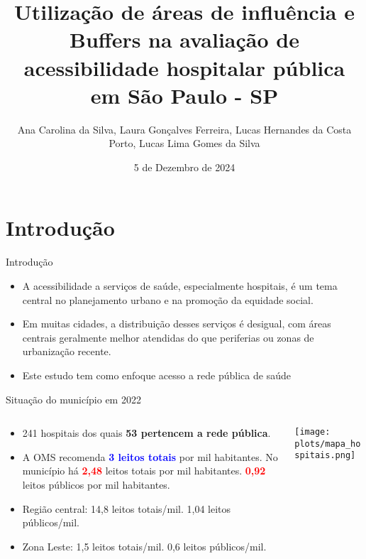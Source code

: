 \documentclass{beamer}
\title{Utilização de áreas de influência e Buffers na avaliação de acessibilidade hospitalar pública em São Paulo - SP}
\author{Ana Carolina da Silva, Laura Gonçalves Ferreira,  Lucas Hernandes da Costa Porto, Lucas Lima Gomes da Silva}
\institute{Universidade de São Paulo}
\date{5 de Dezembro de 2024} %
\begin{document}
\begin{frame}
    \titlepage
\end{frame}


\section{Introdução}
\begin{frame}{Introdução}
            \begin{itemize}
                \item A acessibilidade a serviços de saúde, especialmente hospitais, é um tema central no planejamento urbano e na promoção da equidade social.
                \item Em muitas cidades, a distribuição desses serviços é desigual, com áreas centrais geralmente melhor atendidas do que periferias ou zonas de urbanização recente.
                \item Este estudo tem como enfoque acesso a rede pública de saúde
            \end{itemize}

\end{frame}

\begin{frame}{Situação do município em 2022}
    \begin{columns}
        \begin{column}{0.6\textwidth}
            \begin{itemize}
                \item 241 hospitais dos quais \textbf{53 pertencem a rede pública}.
                \item A OMS recomenda \textbf{\textcolor{blue}{3 leitos totais}} por mil habitantes. No município há \textbf{\textcolor{red}{2,48}} leitos totais por mil habitantes. \textbf{\textcolor{red}{0,92}} leitos públicos por mil habitantes. 
                \item Região central: 14,8 leitos totais/mil. 1,04 leitos públicos/mil.
                \item Zona Leste: 1,5 leitos totais/mil. 0,6 leitos públicos/mil.
            \end{itemize}
        \end{column}

        \begin{column}{0.4\textwidth}
            \centering
            \texttt{[image: plots/mapa\_hospitais.png]} 
        \end{column}
    \end{columns}
\end{frame}
\end{document}
